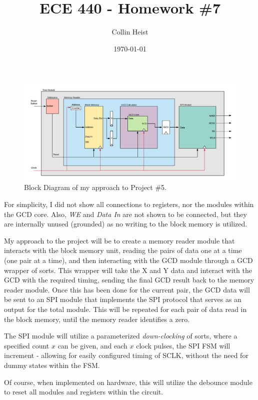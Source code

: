 \documentclass[a4paper, 12pt]{article}
\begin{document}
\title{ECE 440 - Homework \#7}
\author{Collin Heist}
\date{\today}
\maketitle


\begin{figure}[H]
\centering
\includegraphics[width=1.1\textwidth]{BD.png}
\caption{Block Diagram of my approach to Project \#5.}
\label{fig:behav-sim}
\end{figure}

For simplicity, I did not show all connections to registers, nor the modules within the GCD core. Also, \textit{WE} and \textit{Data In} are not shown to be connected, but they are internally unused (grounded) as no writing to the block memory is utilized.

My approach to the project will be to create a memory reader module that interacts with the block memory unit, reading the pairs of data one at a time (one pair at a time), and then interacting with the GCD module through a GCD wrapper of sorts. This wrapper will take the X and Y data and interact with the GCD with the required timing, sending the final GCD result back to the memory reader module. Once this has been done for the current pair, the GCD data will be sent to an SPI module that implements the SPI protocol that serves as an output for the total module. This will be repeated for each pair of data read in the block memory, until the memory reader identifies a zero.

The SPI module will utilize a parameterized \textit{down-clocking} of sorts, where a specified count $x$ can be given, and each $x$ clock pulses, the SPI FSM will increment - allowing for easily configured timing of SCLK, without the need for dummy states within the FSM.

Of course, when implemented on hardware, this will utilize the debounce module to reset all modules and registers within the circuit.
\end{document}
